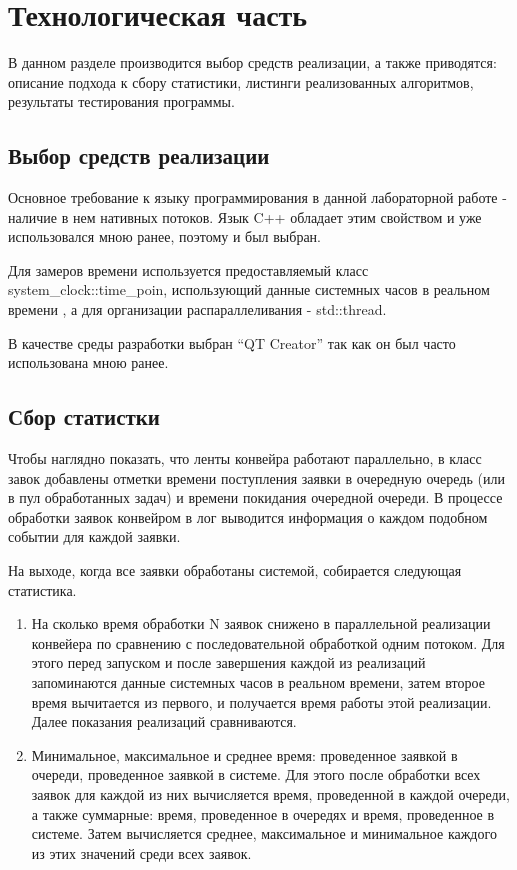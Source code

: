 \chapter{Технологическая часть}

В данном разделе производится выбор средств реализации, а также приводятся: описание подхода к сбору статистики, листинги реализованных алгоритмов, результаты тестирования программы.


\section{Выбор средств реализации}

Основное требование к языку программирования в данной лабораторной работе - наличие в нем нативных потоков. Язык C++ обладает этим свойством \cite{CBook} и уже использовался мною ранее, поэтому и был выбран. 

Для замеров времени используется предоставляемый класс system\_clock::time\_poin, использующий данные системных часов в реальном времени \cite{CBook2}, а для организации распараллеливания -  std::thread.

В качестве среды разработки выбран “QT Creator” так как он был часто использована мною ранее.

\section{Сбор статистки}

Чтобы наглядно показать, что ленты конвейра работают параллельно, в класс завок добавлены отметки времени поступления заявки в очередную очередь (или в пул обработанных задач) и времени покидания очередной очереди. В процессе обработки заявок конвейром в лог выводится информация о каждом подобном событии для каждой заявки.

На выходе, когда все заявки обработаны системой, собирается следующая статистика.
\begin{enumerate}[label={\arabic*)}]
	\item На сколько время обработки N заявок снижено в параллельной реализации конвейера по сравнению с последовательной обработкой одним потоком. Для этого перед запуском и после завершения каждой из реализаций запоминаются данные системных часов в реальном времени, затем второе время вычитается из первого, и получается время работы этой реализации. Далее показания реализаций сравниваются.
	
	\item Минимальное, максимальное и среднее время: проведенное заявкой в очереди, проведенное заявкой в системе. Для этого после обработки всех заявок для каждой из них вычисляется время, проведенной в каждой очереди, а также суммарные: время, проведенное в очередях и время, проведенное в системе. Затем вычисляется среднее, максимальное и минимальное каждого из этих значений среди всех заявок.
\end{enumerate}




